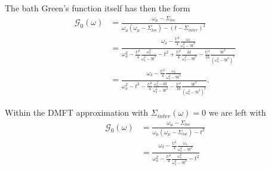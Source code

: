 \documentclass[12pt,a4paper]{scrartcl}
\numberwithin{equation}{section}
\begin{document}
The bath Green's function itself has then the form
\begin{align}
 \mathcal{G}_0(\omega)
 &= \frac{\omega_{\mu}-\Sigma_{loc} }{\omega_{\mu}(\omega_{\mu}-\Sigma_{loc}) -  (t-\Sigma_{inter})^2  } \\
 &= \frac{\omega_{\delta}- \frac{U^2}{4} \frac{\omega_{\delta} }{ \omega^2_{\delta} -9t^2}  }
         { \omega_{\delta}^2 - \frac{U^2}{4} \frac{\omega_{\delta}^2 }{ \omega^2_{\delta} -9t^2} 
           - t^2 + \frac{U^2}{4} \frac{ 6t }{ \omega^2_{\delta} -9t^2}
            - \frac{U^4}{16} \frac{ 9t^2 }{ ( \omega^2_{\delta} -9t^2)^2}} \\
%
 &= \frac{\omega_{\delta}- \frac{U^2}{4} \frac{\omega_{\delta} }{ \omega^2_{\delta} -9t^2}  }
         { \omega_{\delta}^2 
           - t^2 - \frac{U^2}{4} \frac{ \omega_{\delta}^2 - 6t }{ \omega^2_{\delta} -9t^2}
            - \frac{U^4}{16} \frac{ 9t^2 }{ ( \omega^2_{\delta} -9t^2)^2}} .
%
\end{align}

Within the DMFT approximation with $\Sigma_{inter}(\omega)=0$ we are left with
\begin{align}
 \mathcal{G}_0(\omega)
 &= \frac{\omega_{\mu}-\Sigma_{loc} }{\omega_{\mu}(\omega_{\mu}-\Sigma_{loc}) -  t^2  } \\
 &= \frac{\omega_{\delta}- \frac{U^2}{4} \frac{\omega_{\delta} }{ \omega^2_{\delta} -9t^2}  }
         { \omega_{\delta}^2 - \frac{U^2}{4} \frac{\omega_{\delta}^2 }{ \omega^2_{\delta} -9t^2} 
           - t^2 } \\
%
\end{align}
\end{document}
